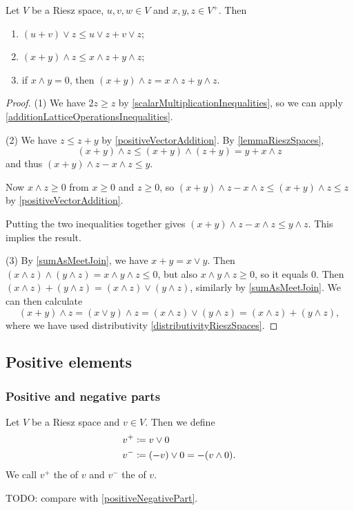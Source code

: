 \begin{lemma} \label{additionLatticeOperationsPositiveElementsInequalities}
Let $V$ be a Riesz space, $u,v,w\in V$ and $x,y,z\in V^+$. Then
\begin{enumerate}
\item $(u+v)\vee z \leq u\vee z + v\vee z$;
\item $(x+y)\wedge z \leq x\wedge z + y\wedge z$;
\item if $x\wedge y = 0$, then $(x+y)\wedge z = x\wedge z + y\wedge z$.
\end{enumerate}
\end{lemma}
\begin{proof}
(1) We have $2z \geq z$ by \ref{scalarMultiplicationInequalities}, so we can apply \ref{additionLatticeOperationsInequalities}.

(2) We have $z \leq z+y$ by \ref{positiveVectorAddition}. By \ref{lemmaRieszSpaces},
\[ (x+y)\wedge z \leq (x+y)\wedge (z+y) = y + x\wedge z \]
and thus $(x+y)\wedge z - x\wedge z \leq y$. 

Now $x\wedge z \geq 0$ from $x\geq 0$ and $z\geq 0$, so $(x+y)\wedge z - x\wedge z \leq (x+y)\wedge z \leq z$ by \ref{positiveVectorAddition}.

Putting the two inequalities together gives $(x+y)\wedge z - x\wedge z \leq y\wedge z$. This implies the result.

(3) By \ref{sumAsMeetJoin}, we have $x+y = x\vee y$. Then $(x\wedge z)\wedge (y\wedge z) = x\wedge y \wedge z \leq 0$, but also $x\wedge y \wedge z \geq 0$, so it equals $0$. Then $(x\wedge z) + (y\wedge z) = (x\wedge z) \vee (y\wedge z)$, similarly by \ref{sumAsMeetJoin}. We can then calculate
\[ (x+y)\wedge z = (x\vee y)\wedge z = (x\wedge z)\vee (y\wedge z) = (x\wedge z) + (y\wedge z), \]
where we have used distributivity \ref{distributivityRieszSpaces}.
\end{proof}

\subsection{Positive elements}
\subsubsection{Positive and negative parts}
\begin{definition}
Let $V$ be a Riesz space and $v\in V$. Then we define
\begin{align*}
v^+ &\coloneqq v \vee 0 \\
v^- &\coloneqq (-v) \vee 0 = - (v \wedge 0).
\end{align*}
We call $v^+$ the  of $v$ and $v^-$ the  of $v$.
\end{definition}
TODO: compare with \ref{positiveNegativePart}.

